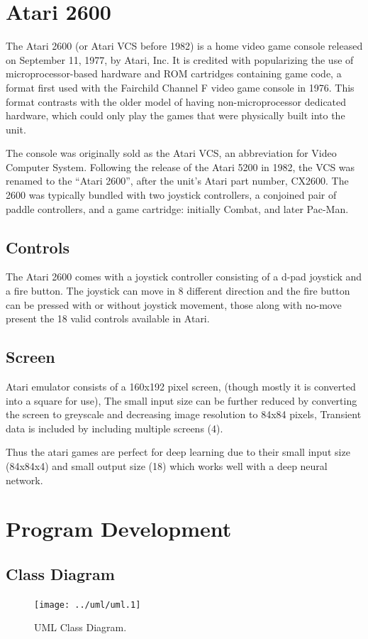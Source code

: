 \documentclass[a4paper,12pt]{report}
\begin{document}
		\section{Atari 2600}
		The Atari 2600 (or Atari VCS before 1982) is a home video game console released on September 11, 1977, by Atari, Inc. It is credited with popularizing the use of microprocessor-based hardware and ROM cartridges containing game code, a format first used with the Fairchild Channel F video game console in 1976. This format contrasts with the older model of having non-microprocessor dedicated hardware, which could only play the games that were physically built into the unit.

		The console was originally sold as the Atari VCS, an abbreviation for Video Computer System. Following the release of the Atari 5200 in 1982, the VCS was renamed to the ``Atari 2600'', after the unit's Atari part number, CX2600. The 2600 was typically bundled with two joystick controllers, a conjoined pair of paddle controllers, and a game cartridge: initially Combat, and later Pac-Man.
		\subsection{Controls}
		The Atari 2600 comes with a joystick controller consisting of a d-pad joystick and a fire button. The joystick can move in 8 different direction and the fire button can be pressed with or without joystick movement, those along with no-move present the 18 valid controls available in Atari.

		\subsection{Screen}
		Atari emulator consists of a 160x192 pixel screen, (though mostly it is converted into a square for use), The small input size can be further reduced by converting the screen to greyscale and decreasing image resolution to 84x84 pixels, Transient data is included by including multiple screens (4). 

		Thus the atari games are perfect for deep learning due to their small input size (84x84x4) and small output size (18) which works well with a deep neural network.
		
		\newpage
		\section{Program Development}
			\subsection{Class Diagram}
				\begin{figure}[H]
					\begin{centering}
						\texttt{[image: ../uml/uml.1]}\\
						\caption{UML Class Diagram.}
					\end{centering}
				\end{figure}
\end{document}
